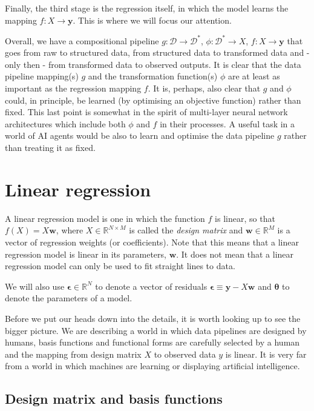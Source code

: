 \documentclass[11pt]{article}
\begin{document}
	Finally, the third stage is the regression itself, in which the model learns the mapping $f: X \rightarrow \boldsymbol{y}$. This is where we will focus our attention.
	
	Overall, we have a compositional pipeline $g: \mathcal{D} \rightarrow \mathcal{D}^{*}$, $\phi: \mathcal{D}^{*} \rightarrow X$, $f: X \rightarrow \boldsymbol{y}$ that goes from raw to structured data, from structured data to transformed data and - only then - from transformed data to observed outputs. It is clear that the data pipeline mapping(s) $g$ and the transformation function(s) $\phi$ are at least as important as the regression mapping $f$. It is, perhaps, also clear that $g$ and $\phi$ could, in principle, be learned (by optimising an objective function) rather than fixed. This last point is somewhat in the spirit of multi-layer neural network architectures which include both $\phi$ and $f$ in their processes. A useful task in a world of AI agents would be also to learn and optimise the data pipeline $g$ rather than treating it as fixed.
	
	\section{Linear regression}
	
	A linear regression model is one in which the function $f$ is linear, so that $f(X) = X\boldsymbol{w}$, where $X \in \mathbb{R}^{N \times M}$ is called the \emph{design matrix} and $\boldsymbol{w} \in \mathbb{R}^{M}$ is a vector of regression weights (or coefficients). Note that this means that a linear regression model is linear in its parameters, $\boldsymbol{w}$. It does not mean that a linear regression model can only be used to fit straight lines to data.
	
	We will also use $\boldsymbol{\epsilon} \in \mathbb{R}^{N}$ to denote a vector of residuals $\boldsymbol{\epsilon} \equiv \boldsymbol{y} - X\boldsymbol{w}$ and $\boldsymbol{\theta}$ to denote the parameters of a model.
	
	Before we put our heads down into the details, it is worth looking up to see the bigger picture. We are describing a world in which data pipelines are designed by humans, basis functions and functional forms are carefully selected by a human and the mapping from design matrix $X$ to observed data $y$ is linear. It is very far from a world in which machines are learning or displaying artificial intelligence.
	
	\subsection{Design matrix and basis functions}
	
\end{document}
